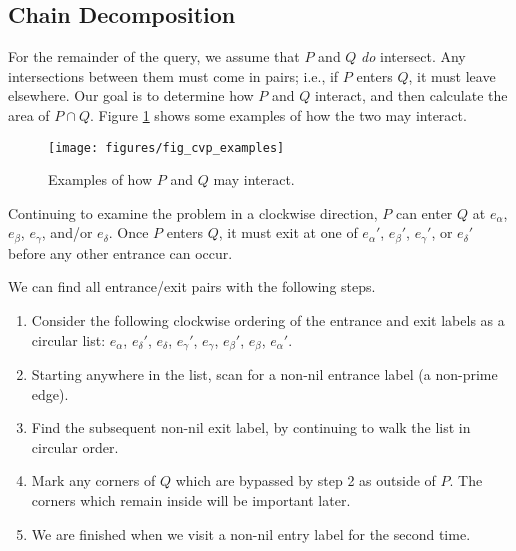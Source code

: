 \subsection{Chain Decomposition}

For the remainder of the query, we assume that $P$ and $Q$ \emph{do} intersect. 
Any intersections between them must come in pairs; i.e., if $P$ enters $Q$, it must leave elsewhere.
Our goal is to determine how $P$ and $Q$ interact, and then calculate the area of $P \cap Q$.  Figure \ref{fig:convexp:examples} shows some examples of how the two may interact.

\begin{figure}[t]
\begin{center}
  \texttt{[image: figures/fig\_cvp\_examples]}
  \caption{Examples of how $P$ and $Q$ may interact.}
  \label{fig:convexp:examples}
\end{center}
\end{figure}

Continuing to examine the problem in a clockwise direction, $P$ can enter $Q$ at $e_\alpha$, $e_\beta$, $e_\gamma$, and/or $e_\delta$.  Once $P$ enters $Q$, it must exit at one of $e_\alpha'$, $e_\beta'$, $e_\gamma'$, or $e_\delta'$ before any other entrance can occur.

We can find all entrance/exit pairs with the following steps.
\begin{enumerate}
 \item Consider the following clockwise ordering of the entrance and exit labels as a circular list: $e_\alpha$, $e_\delta'$, $e_\delta$, $e_\gamma'$, $e_\gamma$, $e_\beta'$, $e_\beta$, $e_\alpha'$.
 
 \item Starting anywhere in the list, scan for a non-nil entrance label (a non-prime edge).
 
 \item Find the subsequent non-nil exit label, by continuing to walk the list in circular order.
 
 \item Mark any corners of $Q$ which are bypassed by step 2 as outside of $P$. The corners which remain inside will be important later.
 
 \item We are finished when we visit a non-nil entry label for the second time.
\end{enumerate}

